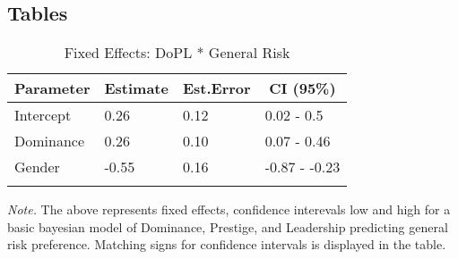 \documentclass[
  donotrepeattitle,doc, 12pt, a4paper,floatsintext]{apa7}
\begin{document}
\newpage

\hypertarget{tables}{%
\subsection{Tables}\label{tables}}

\begin{table}[ht]

\begin{center}
\begin{threeparttable}

\caption{\label{tab:m1-fixef-Experiment-1}Fixed Effects: DoPL * General Risk}

\small{

\begin{tabular}{llll}
\toprule
Parameter & \multicolumn{1}{c}{Estimate} & \multicolumn{1}{c}{Est.Error} & \multicolumn{1}{c}{CI (95\%)}\\
\midrule
Intercept & 0.26 & 0.12 & 0.02 - 0.5\\
Dominance & 0.26 & 0.10 & 0.07 - 0.46\\
Gender & -0.55 & 0.16 & -0.87 - -0.23\\
\bottomrule
\addlinespace
\end{tabular}

}

\begin{tablenotes}[para]
\normalsize{\textit{Note.} The above represents fixed effects, confidence interevals low and high for a basic bayesian model of Dominance, Prestige, and Leadership predicting general risk preference. Matching signs for confidence intervals is displayed in the table.}
\end{tablenotes}

\end{threeparttable}
\end{center}

\end{table}
\end{document}
